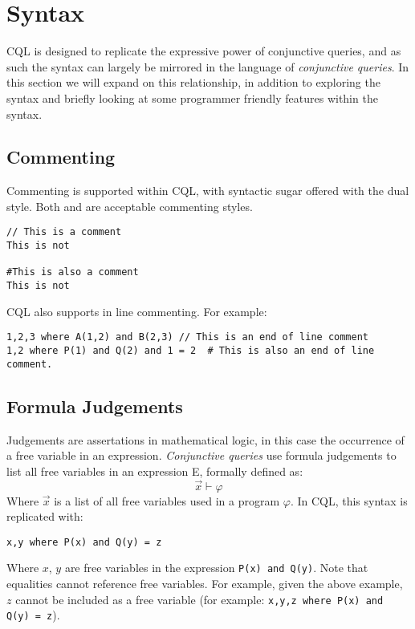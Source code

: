 \section{Syntax}
\begin{normalsize}
CQL is designed to replicate the expressive power of conjunctive queries, and as such the syntax can largely be mirrored in the language of \textit{conjunctive queries}. In this section we will expand on this relationship, in addition to exploring the syntax and briefly looking at some programmer friendly features within the syntax.

\subsection{Commenting}

Commenting is supported within CQL, with syntactic sugar offered with the dual style. Both \codeword{//} and \codeword{#} are acceptable commenting styles.
\begin{lstlisting}[style=framed]
// This is a comment
This is not

#This is also a comment
This is not
\end{lstlisting}
CQL also supports in line commenting. For example:
\begin{lstlisting}[style=framed]
1,2,3 where A(1,2) and B(2,3) // This is an end of line comment
1,2 where P(1) and Q(2) and 1 = 2  # This is also an end of line comment.
\end{lstlisting}


\subsection{Formula Judgements}
Judgements are assertations in mathematical logic, in this case the occurrence of a free variable in an expression. \textit{Conjunctive queries} use formula judgements to list all free variables in an expression E, formally defined as:
$$ \overrightarrow{x} \vdash \varphi $$
Where $\overrightarrow{x}$ is a list of all free variables used in a program $\varphi$.  In CQL, this syntax is replicated with:
\begin{lstlisting}[style=framed]
x,y where P(x) and Q(y) = z
\end{lstlisting}
Where $x$, $y$ are free variables in the expression \lstinline!P(x) and Q(y)!. Note that equalities cannot reference free variables. For example, given the above example, $z$ cannot be included as a free variable (for example: \lstinline[style=framed]!x,y,z where P(x) and Q(y) = z!). 
\end{normalsize}
